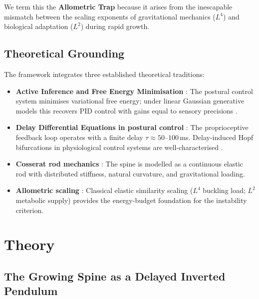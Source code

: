 \documentclass[12pt, letterpaper]{article}
\begin{document}
We term this the \textbf{Allometric Trap} because it arises from the inescapable
mismatch between the scaling exponents of gravitational mechanics ($L^{4}$) and
biological adaptation ($L^{2}$) during rapid growth.

\subsection{Theoretical Grounding}

The framework integrates three established theoretical traditions:

\begin{itemize}
  \item \textbf{Active Inference and Free Energy Minimisation}
    \citep{Friston2010, FristonFEP2019}: The postural control system minimises
    variational free energy; under linear Gaussian generative models this recovers
    PID control with gains equal to sensory precisions \citep{Baltieri2019}.

  \item \textbf{Delay Differential Equations in postural control}
    \citep{MackeyGlass1977, Insperger2011, Peterka2002, Insperger2013,
    Bottaro2008}: The proprioceptive feedback loop operates with a finite delay
    $\tau \approx 50$--$100$\,ms. Delay-induced Hopf bifurcations in physiological
    control systems are well-characterised \citep{MackeyGlass1977}.

  \item \textbf{Cosserat rod mechanics} \citep{Antman2005, Stokes2006}: The
    spine is modelled as a continuous elastic rod with distributed stiffness,
    natural curvature, and gravitational loading.

  \item \textbf{Allometric scaling} \citep{McMahon1973, Biewener1989}: Classical
    elastic similarity scaling ($L^{4}$ buckling load; $L^{2}$ metabolic supply)
    provides the energy-budget foundation for the instability criterion.
\end{itemize}

\section{Theory}

\subsection{The Growing Spine as a Delayed Inverted Pendulum}
\end{document}
